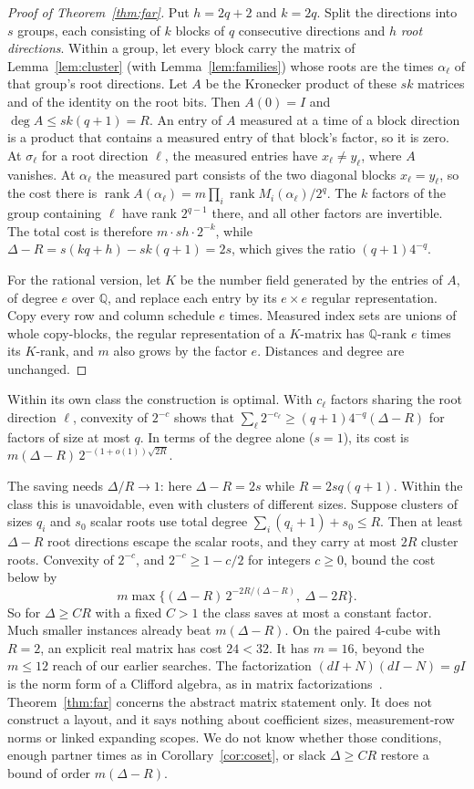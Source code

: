 \documentclass[11pt]{article}
\newcommand{\rank}{\operatorname{rank}}
\begin{document}
\begin{proof}[Proof of Theorem~\ref{thm:far}]
Put $h=2q+2$ and $k=2q$. Split the directions into $s$ groups, each consisting of $k$ blocks of $q$ consecutive directions and $h$ \emph{root directions}. Within a group, let every block carry the matrix of Lemma~\ref{lem:cluster} (with Lemma~\ref{lem:families}) whose roots are the times $\alpha_\ell$ of that group's root directions. Let $A$ be the Kronecker product of these $sk$ matrices and of the identity on the root bits. Then $A(0)=I$ and $\deg A\le sk(q+1)=R$. An entry of $A$ measured at a time of a block direction is a product that contains a measured entry of that block's factor, so it is zero. At $\sigma_\ell$ for a root direction $\ell$, the measured entries have $x_\ell\ne y_\ell$, where $A$ vanishes. At $\alpha_\ell$ the measured part consists of the two diagonal blocks $x_\ell=y_\ell$, so the cost there is $\rank A(\alpha_\ell)=m\prod_i\rank M_i(\alpha_\ell)/2^q$. The $k$ factors of the group containing $\ell$ have rank $2^{q-1}$ there, and all other factors are invertible. The total cost is therefore $m\cdot sh\cdot2^{-k}$, while $\Delta-R=s(kq+h)-sk(q+1)=2s$, which gives the ratio $(q+1)4^{-q}$.

For the rational version, let $K$ be the number field generated by the entries of $A$, of degree $e$ over $\mathbb Q$, and replace each entry by its $e\times e$ regular representation. Copy every row and column schedule $e$ times. Measured index sets are unions of whole copy-blocks, the regular representation of a $K$-matrix has $\mathbb Q$-rank $e$ times its $K$-rank, and $m$ also grows by the factor $e$. Distances and degree are unchanged.
\end{proof}
Within its own class the construction is optimal. With $c_\ell$ factors sharing the root direction $\ell$, convexity of $2^{-c}$ shows that $\sum_\ell2^{-c_\ell}\ge(q+1)4^{-q}(\Delta-R)$ for factors of size at most $q$. In terms of the degree alone ($s=1$), its cost is $m(\Delta-R)\,2^{-(1+o(1))\sqrt{2R}}$.

The saving needs $\Delta/R\to1$: here $\Delta-R=2s$ while $R=2sq(q+1)$. Within the class this is unavoidable, even with clusters of different sizes. Suppose clusters of sizes $q_i$ and $s_0$ scalar roots use total degree $\sum_i(q_i+1)+s_0\le R$. Then at least $\Delta-R$ root directions escape the scalar roots, and they carry at most $2R$ cluster roots. Convexity of $2^{-c}$, and $2^{-c}\ge1-c/2$ for integers $c\ge0$, bound the cost below by
\[m\max\{(\Delta-R)\,2^{-2R/(\Delta-R)},\ \Delta-2R\}.\]
So for $\Delta\ge CR$ with a fixed $C>1$ the class saves at most a constant factor. Much smaller instances already beat $m(\Delta-R)$. On the paired $4$-cube with $R=2$, an explicit real matrix has cost $24<32$. It has $m=16$, beyond the $m\le12$ reach of our earlier searches. The factorization $(dI+N)(dI-N)=gI$ is the norm form of a Clifford algebra, as in matrix factorizations~\cite{eisenbud}. Theorem~\ref{thm:far} concerns the abstract matrix statement only. It does not construct a layout, and it says nothing about coefficient sizes, measurement-row norms or linked expanding scopes. We do not know whether those conditions, enough partner times as in Corollary~\ref{cor:coset}, or slack $\Delta\ge CR$ restore a bound of order $m(\Delta-R)$.
\end{document}
